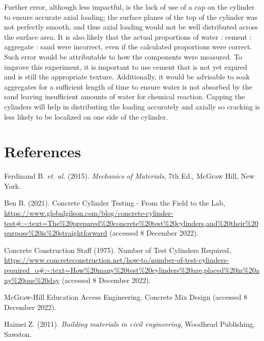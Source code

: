 \documentclass{article}
\begin{document}
    \indent Further error, although less impactful, is the lack of use of a cap on the cylinder to ensure accurate axial loading; the surface planes of the top of the cylinder was not perfectly smooth, and thus axial loading would not be well distributed across the surface area. It is also likely that the actual proportions of water : cement : aggregate : sand were incorrect, even if the calculated proportions were correct. Such error would be attributable to how the components were measured. 
    To improve this experiment, it is important to use cement that is not yet expired and is still the appropriate texture. Additionally, it would be advisable to soak aggregates for a sufficient length of time to ensure water is not absorbed by the sand leaving insufficient amounts of water for chemical reaction. Capping the cylinders will help in distributing the loading accurately and axially so cracking is less likely to be localized on one side of the cylinder. 
    \newpage
    \section{References}
    
    \begin{description}
        \item Ferdinand B. \emph{et. al.} (2015). \emph{Mechanics of Materials}, 7th Ed., McGraw Hill, New York.
        \item Ben B. (2021). Concrete Cylinder Testing - From the Field to the Lab, \url{https://www.globalgilson.com/blog/concrete-cylinder-test#:~:text=The%20prepared%20concrete%20test%20cylinders,and%20their%20purpose%20is%20straightforward} (accessed 8 December 2022).
        \item Concrete Construction Staff (1975). Number of Test Cylinders Required, \url{https://www.concreteconstruction.net/how-to/number-of-test-cylinders-required_o#:~:text=How%20many%20test%20cylinders%20are,placed%20in%20any%20one%20day} (accessed 8 December 2022).
        \item McGraw-Hill Education Access Engineering. Concrete Mix Design (accessed 8 December 2022).
        \item Haimei Z. (2011). \emph{Building materials in civil engineering}, Woodhead Publishing, Sawston.
    \end{description}
    \newpage
\end{document}
